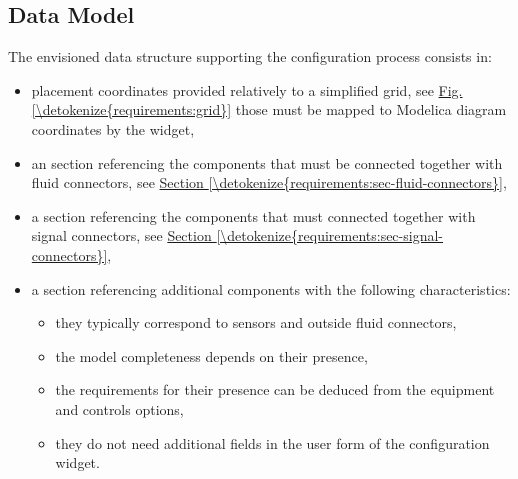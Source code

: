 \documentclass[letterpaper,10pt, openany,english]{sphinxmanual}
\begin{document}
\subsection{Data Model}
\label{\detokenize{requirements:data-model}}
The envisioned data structure supporting the configuration process consists in:
\begin{itemize}
\item {} 
placement coordinates provided relatively to a simplified grid, see \hyperref[\detokenize{requirements:grid}]{Fig.\@ \ref{\detokenize{requirements:grid}}} \textendash{} those must be mapped to Modelica diagram coordinates by the widget,

\item {} 
an  section referencing the components that must be connected together with fluid connectors, see \hyperref[\detokenize{requirements:sec-fluid-connectors}]{Section \ref{\detokenize{requirements:sec-fluid-connectors}}},

\item {} 
a  section referencing the components that must connected together with signal connectors, see \hyperref[\detokenize{requirements:sec-signal-connectors}]{Section \ref{\detokenize{requirements:sec-signal-connectors}}},

\item {} 
a  section referencing additional components with the following characteristics:
\begin{itemize}
\item {} 
they typically correspond to sensors and outside fluid connectors,

\item {} 
the model completeness depends on their presence,

\item {} 
the requirements for their presence can be deduced from the equipment and controls options,

\item {} 
they do not need additional fields in the user form of the configuration widget.

\end{itemize}

\end{itemize}
\end{document}
